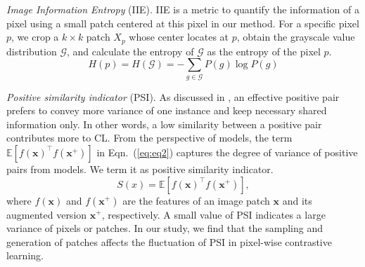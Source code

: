 \documentclass[10pt,twocolumn,letterpaper]{article}
\begin{document}
{\it Image Information Entropy} (IIE). IIE is a metric to quantify the information of a pixel using a small patch centered at this pixel in our method. For a specific pixel $p$, we crop a $k \times k$ patch $X_p$ whose center locates at $p$, obtain the grayscale value distribution $\mathcal{G}$, and calculate the entropy of $\mathcal{G}$ as the entropy of the pixel $p$.
\begin{equation}
    H(p) = H(\mathcal{G}) = - \sum_{g \in \mathcal{G}} P(g) \log P(g)
\end{equation}

{\it Positive similarity indicator} (PSI). As discussed in \cite{tian2020makes,zhu2021improving}, an effective positive pair prefers to convey more variance of one instance and keep necessary shared information only. In other words, a low similarity between a positive pair contributes more to CL. 
From the perspective of models, the term $\mathbb{E}[f(\mathbf{x})^\top f(\mathbf{x^+})]$ in Eqn.~(\ref{eq:eq2}) captures the degree of variance of positive pairs from models. We term it as positive similarity indicator. 
\begin{equation}
    S(x) = {\mathbb{E}} [f(\mathbf{x})^\top f(\mathbf{x^+})],
\end{equation}
where $f(\mathbf{x})$ and $f(\mathbf{x}^+)$ are the features of an image patch $\mathbf{x}$ and its augmented version $\mathbf{x}^+$, respectively. A small value of PSI indicates a large variance of pixels or patches. In our study, we find that the sampling and generation of patches affects the fluctuation of PSI in pixel-wise contrastive learning. 
\end{document}
